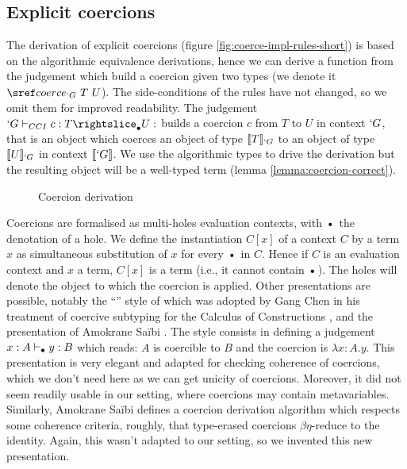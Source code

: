 \documentclass{llncs}
\begin{document}
\subsection{Explicit coercions}
The derivation of explicit coercions (figure
\vref{fig:coerce-impl-rules-short}) is based on the
algorithmic equivalence derivations, hence we can derive a function from
the judgement which build a coercion given two types (we denote it $\coerce{`G}{T}{U}$). 
The side-conditions of the rules have not changed, so we omit them for
improved readability. The judgement $\subimpl{`G}{c}{T}{U}$ builds a
coercion $c$ from $T$ to $U$ in context $`G$, that is an object which
coerces an object of type $\llbracket T \rrbracket_{`G}$ to an object of type $\llbracket U \rrbracket_{`G}$
in context $\llbracket `G \rrbracket$. We use the algorithmic types to drive the
derivation but the resulting object will be a well-typed \Coq{} term
(lemma \ref{lemma:coercion-correct}). 

\begin{figure}[ht]
  \vspace{-1em}
  \subtisc
  \vspace{-2em}
  \caption{Coercion derivation}
  \label{fig:coerce-impl-rules-short}
  \vspace{-1em}
\end{figure}

Coercions are formalised as multi-holes evaluation contexts, with
$\ctxdot$ the denotation of a hole. We define the instantiation $C[x]$ of a context $C$
by a term $x$ as simultaneous substitution of $x$ for every $\ctxdot$ in $C$.
Hence if $C$ is an evaluation context and $x$ a term, $C[x]$ is a term
(i.e., it cannot contain $\ctxdot$).
The holes will denote the object to which the coercion is applied.
Other
presentations are possible, notably the ``\LMS{}'' style of \cite{longo95logic} which
was adopted by Gang Chen in his treatment of coercive subtyping for the
Calculus of Constructions \cite{conf/popl/Chen03}, and the presentation 
of Amokrane Sa\"ibi \cite{saibi97inheritance}. The \LMS{} style consists
in defining a judgement $x : A \vdash_{\bullet} y : B$ which reads: $A$ is
coercible to $B$ and the coercion is $\lambda x : A.y$. This
presentation is very elegant and adapted for checking coherence 
of coercions, which we don't need here as we can get unicity
of coercions. Moreover, it did not seem readily usable in
our setting, where coercions may contain metavariables. Similarly, Amokrane Sa\"ibi defines
a coercion derivation algorithm which respects some coherence criteria,
roughly, that type-erased coercions $\beta\eta$-reduce to the
identity. Again, this wasn't adapted to our setting, so we invented this
new presentation. 
 
\end{document}
